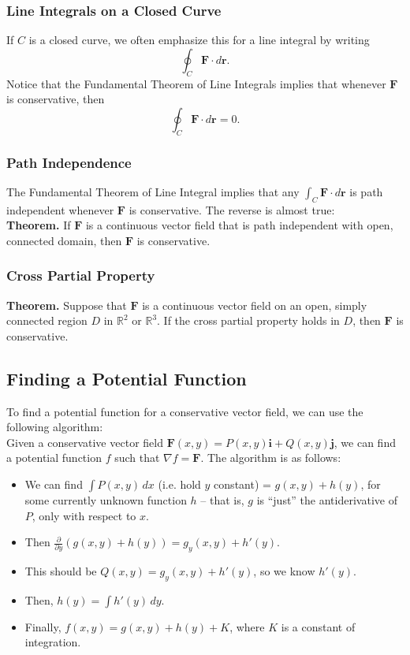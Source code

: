 \subsubsection{Line Integrals on a Closed Curve}

If \(C\) is a closed curve, we often emphasize this for a line integral by writing 
\[
    \oint_C \mathbf{F} \cdot d\mathbf{r}.
\]
Notice that the Fundamental Theorem of Line Integrals implies that whenever \(\mathbf{F}\) is conservative, then
\[
    \oint_C \mathbf{F} \cdot d\mathbf{r} = 0.
\]

\subsubsection{Path Independence}

The Fundamental Theorem of Line Integral implies that any \(\int_C \mathbf{F} \cdot d\mathbf{r}\) is path independent whenever \(\mathbf{F}\) is conservative. The reverse is almost true: \\

\textbf{Theorem.} If \(\mathbf{F}\) is a continuous vector field that is path independent with open, connected domain, then \(\mathbf{F}\) is conservative.

\subsubsection{Cross Partial Property}

\textbf{Theorem.} Suppose that \(\mathbf{F}\) is a continuous vector field on an open, simply connected region \(D\) in \(\mathbb{R}^2\) or \(\mathbb{R}^3\). If the cross partial property holds in \(D\), then \(\mathbf{F}\) is conservative.

\subsection{Finding a Potential Function}

To find a potential function for a conservative vector field, we can use the following algorithm: \\

Given a conservative vector field \(\mathbf{F}(x,y) = P(x,y)\mathbf{i} + Q(x,y)\mathbf{j}\), we can find a potential function \(f\) such that \(\nabla f = \mathbf{F}\). The algorithm is as follows:

\begin{itemize}
    \item We can find \(\int P(x,y) \, dx\) (i.e. hold \(y\) constant) = \(g(x,y) + h(y)\), for some currently unknown function \(h\) – that is, \(g\) is “just” the antiderivative of \(P\), only with respect to \(x\).
    \item Then \(\frac{\partial}{\partial y} (g(x,y) + h(y)) = g_y(x,y) + h'(y)\).
    \item This should be \(Q(x,y) = g_y(x,y) + h'(y)\), so we know \(h'(y)\).
    \item Then, \(h(y) = \int h'(y) \, dy\).
    \item Finally, \(f(x,y) = g(x,y) + h(y) + K\), where \(K\) is a constant of integration.
\end{itemize}

